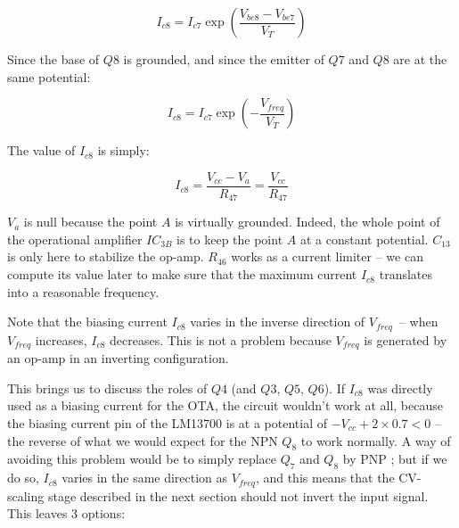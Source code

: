 \documentclass[a4paper,11pt]{article}
\begin{document}
\begin{equation}
I_{c8} = I_{c7} \exp \left( \frac{V_{be8} - V_{be7}}{V_T} \right)
\end{equation}

Since the base of $Q8$ is grounded, and since the emitter of $Q7$ and $Q8$ are at the same potential:

\begin{equation}
I_{c8} = I_{c7} \exp \left( -\frac{V_{freq}}{V_T} \right)
\end{equation}

The value of $I_{c8}$ is simply:

\begin{equation}
I_{c8} = \frac{V_{cc} - V_a}{R_{47}} = \frac{V_{cc}}{R_{47}}
\end{equation}

$V_a$ is null because the point $A$ is virtually grounded. Indeed, the whole point of the operational amplifier $IC_{3B}$ is to keep the point $A$ at a constant potential. $C_{13}$ is only here to stabilize the op-amp. $R_{46}$ works as a current limiter -- we can compute its value later to make sure that the maximum current $I_{c8}$ translates into a reasonable frequency.

Note that the biasing current $I_{c8}$ varies in the inverse direction of $V_{freq}$~-- when $V_{freq}$ increases, $I_{c8}$ decreases. This is not a problem because $V_{freq}$ is generated by an op-amp in an inverting configuration.

This brings us to discuss the roles of $Q4$ (and $Q3$, $Q5$, $Q6$). If $I_{c8}$ was directly used as a biasing current for the OTA, the circuit wouldn't work at all, because the biasing current pin of the LM13700 is at a potential of $-V_{cc} + 2 \times 0.7 < 0$ -- the reverse of what we would expect for the NPN $Q_8$ to work normally. A way of avoiding this problem would be to simply replace $Q_7$ and $Q_8$ by PNP ; but if we do so, $I_{c8}$ varies in the same direction as $V_{freq}$, and this means that the CV-scaling stage described in the next section should not invert the input signal. This leaves 3 options:
\end{document}

